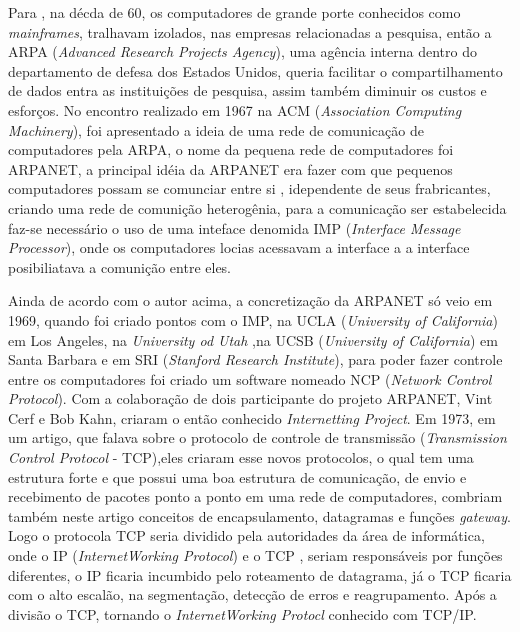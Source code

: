\par Para , na décda de 60, os computadores de
grande porte conhecidos como \textit{mainframes}, tralhavam izolados, nas
empresas relacionadas a pesquisa, então a ARPA (\textit{Advanced Research
Projects Agency}), uma agência interna dentro do departamento de defesa dos
Estados Unidos, queria facilitar o compartilhamento de dados entra as
instituições de pesquisa, assim também diminuir os custos e esforços.
No encontro realizado em 1967 na ACM (\textit{Association Computing
Machinery}), foi apresentado a ideia de uma rede de comunicação de computadores
pela ARPA, o nome da pequena rede de computadores foi ARPANET, a principal idéia
da ARPANET era fazer com que pequenos computadores possam se comunciar entre si
, idependente de seus frabricantes, criando uma rede de comunição heterogênia,
para a comunicação ser estabelecida faz-se necessário o uso de uma inteface
denomida IMP (\textit{Interface Message Processor}), onde os computadores locias
acessavam a interface a a interface posibiliatava a comunição entre eles.

\par Ainda de acordo com o autor acima, a concretização da ARPANET só veio em
1969, quando foi criado pontos com o IMP, na UCLA (\textit{University of
California}) em Los Angeles, na \textit{University od Utah} ,na UCSB
(\textit{University of California}) em Santa Barbara e em SRI
(\textit{Stanford Research Institute}), para poder fazer controle
entre os computadores foi criado um software nomeado NCP (\textit{Network
Control Protocol}). Com a colaboração de dois participante do projeto ARPANET,
Vint Cerf e Bob Kahn, criaram o então conhecido \textit{Internetting Project}. 
Em 1973, em um artigo, que falava sobre o protocolo de controle de
transmissão (\textit{Transmission Control Protocol} - TCP),eles criaram esse
novos protocolos, o qual tem uma estrutura forte e que possui uma boa estrutura
de comunicação, de envio e recebimento de pacotes ponto a ponto em uma rede de
computadores, combriam também neste artigo conceitos de encapsulamento,
datagramas e funções \textit{gateway}. Logo o protocola TCP seria dividido pela
autoridades da área de informática, onde o IP (\textit{InternetWorking
Protocol}) e o TCP , seriam responsáveis por funções diferentes, o IP ficaria
incumbido pelo roteamento de datagrama, já o TCP ficaria com o alto escalão, na
segmentação, detecção de erros e reagrupamento. Após a divisão o TCP, tornando o \textit{InternetWorking
Protocl} conhecido com TCP/IP.

